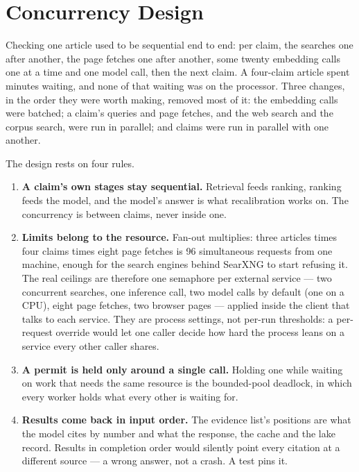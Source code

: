 
\section{Concurrency Design}
\label{sec:design-concurrency}

Checking one article used to be sequential end to end: per claim, the
searches one after another, the page fetches one after another, some
twenty embedding calls one at a time and one model call, then the next
claim. A four-claim article spent minutes waiting, and none of that
waiting was on the processor. Three changes, in the order they were
worth making, removed most of it: the embedding calls were batched; a
claim's queries and page fetches, and the web search and the corpus
search, were run in parallel; and claims were run in parallel with one
another.

The design rests on four rules.

\begin{enumerate}
    \item \textbf{A claim's own stages stay sequential.} Retrieval feeds
    ranking, ranking feeds the model, and the model's answer is what
    recalibration works on. The concurrency is between claims, never
    inside one.
    \item \textbf{Limits belong to the resource.} Fan-out multiplies:
    three articles times four claims times eight page fetches is 96
    simultaneous requests from one machine, enough for the search
    engines behind SearXNG to start refusing it. The real ceilings are
    therefore one semaphore per external service --- two concurrent
    searches, one inference call, two model calls by default (one on a
    CPU), eight page fetches, two browser pages --- applied inside the
    client that talks to each service. They are process settings, not
    per-run thresholds: a per-request override would let one caller
    decide how hard the process leans on a service every other caller
    shares.
    \item \textbf{A permit is held only around a single call.} Holding
    one while waiting on work that needs the same resource is the
    bounded-pool deadlock, in which every worker holds what every other
    is waiting for.
    \item \textbf{Results come back in input order.} The evidence list's
    positions are what the model cites by number and what the response,
    the cache and the lake record. Results in completion order would
    silently point every citation at a different source --- a wrong
    answer, not a crash. A test pins it.
\end{enumerate}

